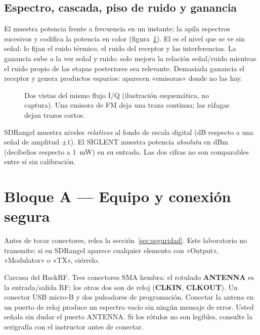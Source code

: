\subsection{Espectro, cascada, piso de ruido y ganancia}

El  muestra potencia frente a frecuencia en un instante; la  apila espectros sucesivos y codifica la potencia en color (figura~\ref{fig:waterfall}). El  es el nivel que se ve sin señal: lo fijan el ruido térmico, el ruido del receptor y las interferencias. La ganancia sube a la vez señal y ruido: solo mejora la relación señal/ruido mientras el ruido propio de las etapas posteriores sea relevante. Demasiada ganancia  el receptor y genera productos espurios: aparecen «emisoras» donde no las hay.

\begin{figure}[H]
\centering

\caption{Dos vistas del mismo flujo I/Q (ilustración esquemática, no captura). Una emisora de FM deja una traza continua; las ráfagas dejan trazos cortos.}
\label{fig:waterfall}
\end{figure}

\begin{nota}
SDRangel muestra niveles \emph{relativos} al fondo de escala digital (dB respecto a una señal de amplitud $\pm1$). El SIGLENT muestra potencia \emph{absoluta} en dBm (decibelios respecto a 1~mW) en su entrada. Las dos cifras no son comparables entre sí sin calibración.
\end{nota}

\section{Bloque A --- Equipo y conexión segura}
\label{sec:w-equipo}

\begin{alerta}
Antes de tocar conectores, relea la sección~\ref{sec:seguridad}. Este laboratorio no transmite: si en SDRangel aparece cualquier elemento con «Output», «Modulator» o «TX», ciérrelo.
\end{alerta}

{Carcasa del HackRF.}
{Tres conectores SMA hembra: el rotulado \textbf{ANTENNA} es la entrada/salida RF; los otros dos son de reloj (\textbf{CLKIN}, \textbf{CLKOUT}). Un conector USB micro-B y dos pulsadores de programación.}
{Conectar la antena en un puerto de reloj produce un espectro vacío sin ningún mensaje de error.}
{Usted señala sin dudar el puerto ANTENNA.}
{Si los rótulos no son legibles, consulte la serigrafía con el instructor antes de conectar.}
{}

